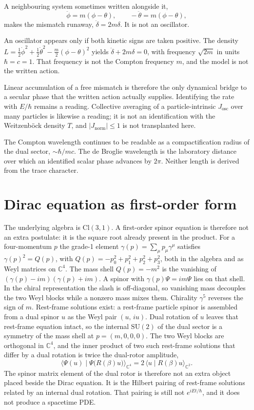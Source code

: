 \documentclass[a4paper]{article}
\begin{document}
A neighbouring system sometimes written alongside it,
\[
\ddot\phi=m(\phi-\theta),\qquad -\ddot\theta=m(\phi-\theta),
\]
makes the mismatch runaway, \(\ddot\delta=2m\delta\). It is not an oscillator.

An oscillator appears only if both kinetic signs are taken positive. The density \(L=\tfrac12\dot\phi^2+\tfrac12\dot\theta^2-\tfrac m2(\phi-\theta)^2\) yields \(\ddot\delta+2m\delta=0\), with frequency \(\sqrt{2m}\) in units \(\hbar=c=1\). That frequency is not the Compton frequency \(m\), and the model is not the written action.

Linear accumulation of a free mismatch is therefore the only dynamical bridge to a secular phase that the written action actually supplies. Identifying the rate with \(E/\hbar\) remains a reading. Collective averaging of a particle-intrinsic \(J_{\mathrm{osc}}\) over many particles is likewise a reading; it is not an identification with the Weitzenb\"ock density \(T\), and \(\lvert J_{\mathrm{norm}}\rvert\le 1\) is not transplanted here.

The Compton wavelength continues to be readable as a compactification radius of the dual sector, \(\sim\hbar/mc\). The de Broglie wavelength is the laboratory distance over which an identified scalar phase advances by \(2\pi\). Neither length is derived from the trace character.

\section{Dirac equation as first-order form}

The underlying algebra is \(\mathrm{Cl}(3,1)\). A first-order spinor equation is therefore not an extra postulate: it is the square root already present in the product. For a four-momentum \(p\) the grade-1 element \(\gamma(p)=\sum_{\mu}p_{\mu}\gamma^{\mu}\) satisfies \(\gamma(p)^2=Q(p)\), with \(Q(p)=-p_0^2+p_1^2+p_2^2+p_3^2\), both in the algebra and as Weyl matrices on \(\mathbb{C}^4\). The mass shell \(Q(p)=-m^2\) is the vanishing of \((\gamma(p)-im)(\gamma(p)+im)\). A spinor with \(\gamma(p)\Psi=im\Psi\) lies on that shell. In the chiral representation the slash is off-diagonal, so vanishing mass decouples the two Weyl blocks while a nonzero mass mixes them. Chirality \(\gamma^5\) reverses the sign of \(m\). Rest-frame solutions exist: a rest-frame particle spinor is assembled from a dual spinor \(u\) as the Weyl pair \((u,\,iu)\). Dual rotation of \(u\) leaves that rest-frame equation intact, so the internal \(\mathrm{SU}(2)\) of the dual sector is a symmetry of the mass shell at \(p=(m,0,0,0)\). The two Weyl blocks are orthogonal in \(\mathbb{C}^4\), and the inner product of two such rest-frame solutions that differ by a dual rotation is twice the dual-rotor amplitude,
\[
\langle\Psi(u)\mid\Psi\bigl(R(\beta)u\bigr)\rangle_{\mathbb{C}^4}
  =2\,\langle u\mid R(\beta)u\rangle_{\mathbb{C}^2}.
\]
The spinor matrix element of the dual rotor is therefore not an extra object placed beside the Dirac equation. It is the Hilbert pairing of rest-frame solutions related by an internal dual rotation. That pairing is still not \(e^{iEt/\hbar}\), and it does not produce a spacetime PDE.
\end{document}
